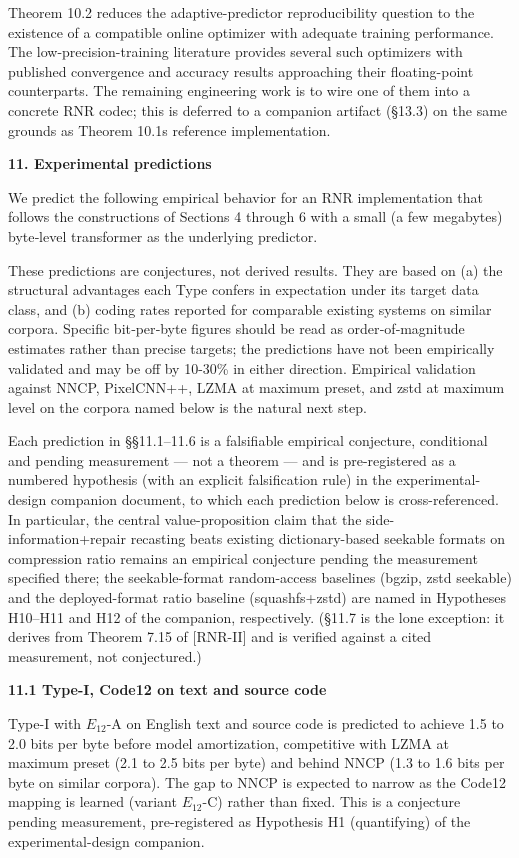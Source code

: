 \documentclass[
]{article}
\begin{document}
Theorem 10.2 reduces the adaptive-predictor reproducibility question to
the existence of a compatible online optimizer with adequate training
performance. The low-precision-training literature provides several such
optimizers with published convergence and accuracy results approaching
their floating-point counterparts. The remaining engineering work is to
wire one of them into a concrete RNR codec; this is deferred to a
companion artifact (§13.3) on the same grounds as Theorem
10.1\textquotesingle s reference implementation.

\textbf{11. Experimental predictions}

We predict the following empirical behavior for an RNR implementation
that follows the constructions of Sections 4 through 6 with a small (a
few megabytes) byte‑level transformer as the underlying predictor.

These predictions are conjectures, not derived results. They are based
on (a) the structural advantages each Type confers in expectation under
its target data class, and (b) coding rates reported for comparable
existing systems on similar corpora. Specific bit‑per‑byte figures
should be read as order‑of‑magnitude estimates rather than precise
targets; the predictions have not been empirically validated and may be
off by 10-30\% in either direction. Empirical validation against NNCP,
PixelCNN++, LZMA at maximum preset, and zstd at maximum level on the
corpora named below is the natural next step.

Each prediction in \S\S11.1--11.6 is a falsifiable empirical conjecture,
conditional and pending measurement --- not a theorem --- and is
pre-registered as a numbered hypothesis (with an explicit falsification
rule) in the experimental-design companion document, to which each
prediction below is cross-referenced. In particular, the central
value-proposition claim that the side-information+repair recasting beats
existing dictionary-based seekable formats on compression ratio remains
an empirical conjecture pending the measurement specified there; the
seekable-format random-access baselines (bgzip, zstd seekable) and the
deployed-format ratio baseline (squashfs+zstd) are named in Hypotheses
H10--H11 and H12 of the companion, respectively. (\S11.7 is the lone
exception: it derives from Theorem 7.15 of [RNR-II] and is verified against a cited
measurement, not conjectured.)

\textbf{11.1 Type-I, Code12 on text and source code}

Type-I with $E_{12}$-A on English text and source code is predicted
to achieve 1.5 to 2.0 bits per byte before model amortization,
competitive with LZMA at maximum preset (2.1 to 2.5 bits per byte)
and behind NNCP (1.3 to 1.6 bits per byte on similar corpora). The
gap to NNCP is expected to narrow as the Code12 mapping is learned
(variant $E_{12}$-C) rather than fixed. This is a conjecture pending
measurement, pre-registered as Hypothesis H1 (quantifying) of the
experimental-design companion.
\end{document}
